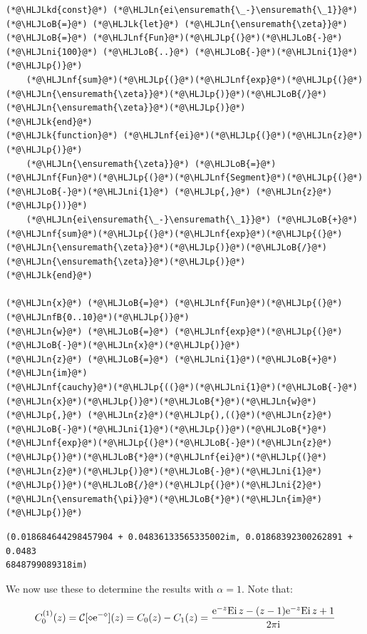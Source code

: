 \documentclass[12pt,a4paper]{article}
\newcommand{\HLJLk}[1]{\textcolor[RGB]{148,91,176}{\textbf{#1}}}
\newcommand{\HLJLkd}[1]{\textcolor[RGB]{214,102,97}{\textit{#1}}}
\newcommand{\HLJLn}[1]{#1}
\newcommand{\HLJLnf}[1]{\textcolor[RGB]{66,102,213}{#1}}
\newcommand{\HLJLnfB}[1]{\textcolor[RGB]{59,151,46}{#1}}
\newcommand{\HLJLni}[1]{\textcolor[RGB]{59,151,46}{#1}}
\newcommand{\HLJLoB}[1]{\textcolor[RGB]{102,102,102}{\textbf{#1}}}
\newcommand{\HLJLp}[1]{#1}
\def\I{ {\rm i} }
\def\E{ {\rm e} }
\def\CC{ {\cal C} }
\def\Ei{ {\rm Ei}\, }
\begin{document}
\begin{lstlisting}
(*@\HLJLkd{const}@*) (*@\HLJLn{ei\ensuremath{\_-}\ensuremath{\_1}}@*) (*@\HLJLoB{=}@*) (*@\HLJLk{let}@*) (*@\HLJLn{\ensuremath{\zeta}}@*) (*@\HLJLoB{=}@*) (*@\HLJLnf{Fun}@*)(*@\HLJLp{(}@*)(*@\HLJLoB{-}@*)(*@\HLJLni{100}@*) (*@\HLJLoB{..}@*) (*@\HLJLoB{-}@*)(*@\HLJLni{1}@*)(*@\HLJLp{)}@*)
    (*@\HLJLnf{sum}@*)(*@\HLJLp{(}@*)(*@\HLJLnf{exp}@*)(*@\HLJLp{(}@*)(*@\HLJLn{\ensuremath{\zeta}}@*)(*@\HLJLp{)}@*)(*@\HLJLoB{/}@*)(*@\HLJLn{\ensuremath{\zeta}}@*)(*@\HLJLp{)}@*)
(*@\HLJLk{end}@*)
(*@\HLJLk{function}@*) (*@\HLJLnf{ei}@*)(*@\HLJLp{(}@*)(*@\HLJLn{z}@*)(*@\HLJLp{)}@*) 
    (*@\HLJLn{\ensuremath{\zeta}}@*) (*@\HLJLoB{=}@*) (*@\HLJLnf{Fun}@*)(*@\HLJLp{(}@*)(*@\HLJLnf{Segment}@*)(*@\HLJLp{(}@*)(*@\HLJLoB{-}@*)(*@\HLJLni{1}@*) (*@\HLJLp{,}@*) (*@\HLJLn{z}@*)(*@\HLJLp{))}@*)
    (*@\HLJLn{ei\ensuremath{\_-}\ensuremath{\_1}}@*) (*@\HLJLoB{+}@*) (*@\HLJLnf{sum}@*)(*@\HLJLp{(}@*)(*@\HLJLnf{exp}@*)(*@\HLJLp{(}@*)(*@\HLJLn{\ensuremath{\zeta}}@*)(*@\HLJLp{)}@*)(*@\HLJLoB{/}@*)(*@\HLJLn{\ensuremath{\zeta}}@*)(*@\HLJLp{)}@*)
(*@\HLJLk{end}@*)

(*@\HLJLn{x}@*) (*@\HLJLoB{=}@*) (*@\HLJLnf{Fun}@*)(*@\HLJLp{(}@*)(*@\HLJLnfB{0..10}@*)(*@\HLJLp{)}@*)
(*@\HLJLn{w}@*) (*@\HLJLoB{=}@*) (*@\HLJLnf{exp}@*)(*@\HLJLp{(}@*)(*@\HLJLoB{-}@*)(*@\HLJLn{x}@*)(*@\HLJLp{)}@*)
(*@\HLJLn{z}@*) (*@\HLJLoB{=}@*) (*@\HLJLni{1}@*)(*@\HLJLoB{+}@*)(*@\HLJLn{im}@*)
(*@\HLJLnf{cauchy}@*)(*@\HLJLp{((}@*)(*@\HLJLni{1}@*)(*@\HLJLoB{-}@*)(*@\HLJLn{x}@*)(*@\HLJLp{)}@*)(*@\HLJLoB{*}@*)(*@\HLJLn{w}@*)(*@\HLJLp{,}@*) (*@\HLJLn{z}@*)(*@\HLJLp{),((}@*)(*@\HLJLn{z}@*)(*@\HLJLoB{-}@*)(*@\HLJLni{1}@*)(*@\HLJLp{)}@*)(*@\HLJLoB{*}@*)(*@\HLJLnf{exp}@*)(*@\HLJLp{(}@*)(*@\HLJLoB{-}@*)(*@\HLJLn{z}@*)(*@\HLJLp{)}@*)(*@\HLJLoB{*}@*)(*@\HLJLnf{ei}@*)(*@\HLJLp{(}@*)(*@\HLJLn{z}@*)(*@\HLJLp{)}@*)(*@\HLJLoB{-}@*)(*@\HLJLni{1}@*)(*@\HLJLp{)}@*)(*@\HLJLoB{/}@*)(*@\HLJLp{(}@*)(*@\HLJLni{2}@*)(*@\HLJLn{\ensuremath{\pi}}@*)(*@\HLJLoB{*}@*)(*@\HLJLn{im}@*)(*@\HLJLp{)}@*)
\end{lstlisting}

\begin{lstlisting}
(0.018684644298457904 + 0.04836133565335002im, 0.01868392300262891 + 0.0483
6848799089318im)
\end{lstlisting}


We now use these to determine the results with $\alpha = 1$. Note that:

\[
C_0^{(1)}(z) = \CC[\diamond \E^{-\diamond}](z) =C_0(z) - C_1(z) = { \E^{-z} \Ei z - (z-1) \E^{-z} \Ei z +1 \over 2 \pi \I} 
\]
\end{document}
